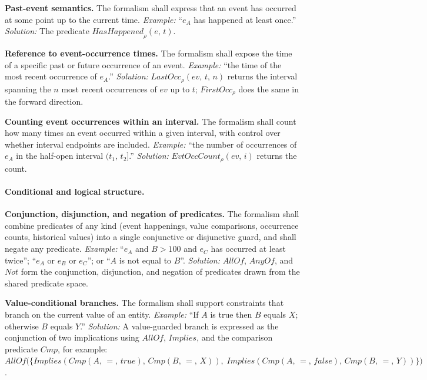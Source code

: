 \textbf{Past-event semantics.} The formalism shall express that an event has occurred at some point up to the current time. \textit{Example:} ``$e_A$ has happened at least once.'' \textit{Solution:} The predicate $\mathit{HasHappened}_\rho(e,\, t)$.

\textbf{Reference to event-occurrence times.} The formalism shall expose the time of a specific past or future occurrence of an event. \textit{Example:} ``the time of the most recent occurrence of $e_A$.'' \textit{Solution:} $\mathit{LastOcc}_\rho(ev,\, t,\, n)$ returns the interval spanning the $n$ most recent occurrences of $ev$ up to $t$; $\mathit{FirstOcc}_\rho$ does the same in the forward direction.

\textbf{Counting event occurrences within an interval.} The formalism shall count how many times an event occurred within a given interval, with control over whether interval endpoints are included. \textit{Example:} ``the number of occurrences of $e_A$ in the half-open interval $(t_1,\, t_2]$.'' \textit{Solution:} $\mathit{EvtOccCount}_\rho(ev,\, i)$ returns the count.

\paragraph{Conditional and logical structure.}

\textbf{Conjunction, disjunction, and negation of predicates.} The formalism shall combine predicates of any kind (event happenings, value comparisons, occurrence counts, historical values) into a single conjunctive or disjunctive guard, and shall negate any predicate. \textit{Example:} ``$e_A$ and $B > 100$ and $e_C$ has occurred at least twice''; ``$e_A$ or $e_B$ or $e_C$''; or ``$A$ is not equal to $B$''. \textit{Solution:} $\mathit{AllOf}$, $\mathit{AnyOf}$, and $\mathit{Not}$ form the conjunction, disjunction, and negation of predicates drawn from the shared predicate space.

\textbf{Value-conditional branches.} The formalism shall support constraints that branch on the current value of an entity. \textit{Example:} ``If $A$ is true then $B$ equals $X$; otherwise $B$ equals $Y$.'' \textit{Solution:} A value-guarded branch is expressed as the conjunction of two implications using $\mathit{AllOf}$, $\mathit{Implies}$, and the comparison predicate $\mathit{Cmp}$, for example:
$\mathit{AllOf}\bigl(\{\mathit{Implies}(\mathit{Cmp}(A,\, =,\, \mathit{true}),\, \mathit{Cmp}(B,\, =,\, X)),\; \mathit{Implies}(\mathit{Cmp}(A,\, =,\, \mathit{false}),\, \mathit{Cmp}(B,\, =,\, Y))\}\bigr)$.

